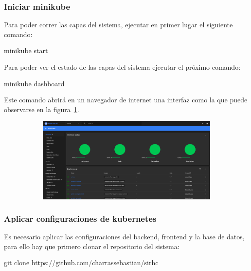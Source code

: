 \documentclass[twoside]{article}
\begin{document}
\subsubsection{Iniciar minikube}
Para poder correr las capas del sistema, ejecutar en primer lugar el siguiente comando:

minikube start

Para poder ver el estado de las capas del sistema ejecutar el próximo comando:

minikube dashboard

Este comando abrirá en un navegador de internet una interfaz como la que puede observarse en la figura~\ref{fig:kubernetesDashboard}.
\begin{figure}[H]
	\caption{Interfaz del dashboard de Kubernetes}
    \begin{subfigure}{1\textwidth}
	\includegraphics[width=1\textwidth]{kubernetesDashboard.png}
    \end{subfigure}
	\label{fig:kubernetesDashboard}
\end{figure}
\vspace{-1.0\baselineskip}

\subsubsection{Aplicar configuraciones de kubernetes}
Es necesario aplicar las configuraciones del backend, frontend y la base de datos, para ello hay que primero clonar el repositorio del sistema:

git clone https://github.com/charrassebastian/sirhc
\end{document}
